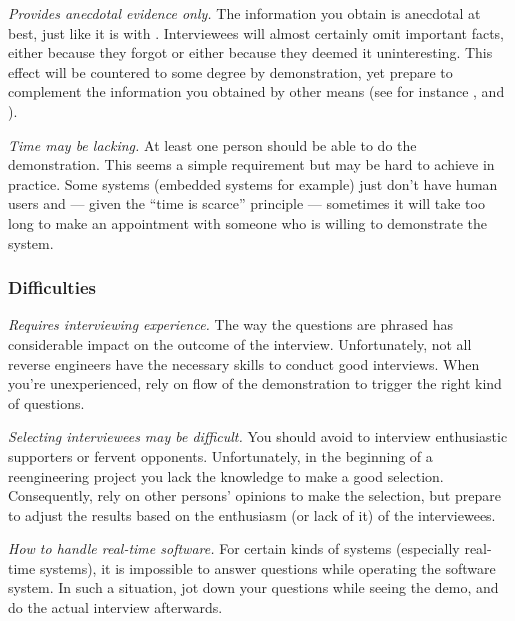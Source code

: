 \documentclass[a4paper,10pt,twoside]{book}
\begin{document}
\begin{bulletlist}
  \item \emph{Provides anecdotal evidence only.}
The information you obtain is anecdotal at best, just like it is with . Interviewees will almost certainly omit important facts, either because they forgot or either because they deemed it uninteresting. This effect will be countered to some degree by demonstration, yet prepare to complement the information you obtained by other means (see for instance ,  and ).

  \item \emph{Time may be lacking.}
At least one person should be able to do the demonstration. This seems a simple requirement but may be hard to achieve in practice. Some systems (embedded systems for example) just don't have human users and --- given the ``time is scarce'' principle --- sometimes it will take too long to make an appointment with someone who is willing to demonstrate the system.
\end{bulletlist}

\subsubsection*{Difficulties}

\begin{bulletlist}
  \item \emph{Requires interviewing experience.}
The way the questions are phrased has considerable impact on the outcome of the interview. Unfortunately, not all reverse engineers have the necessary skills to conduct good interviews. When you're unexperienced, rely on flow of the demonstration to trigger the right kind of questions.

  \item \emph{Selecting interviewees may be difficult.}
You should avoid to interview enthusiastic supporters or fervent opponents. Unfortunately, in the beginning of a reengineering project you lack the knowledge to make a good selection. Consequently, rely on other persons' opinions to make the selection, but prepare to adjust the results based on the enthusiasm (or lack of it) of the interviewees.

  \item \emph{How to handle real-time software.}
For certain kinds of systems (especially real-time systems), it is impossible to answer questions while operating the software system. In such a situation, jot down your questions while seeing the demo, and do the actual interview afterwards.
\end{bulletlist}
\end{document}
